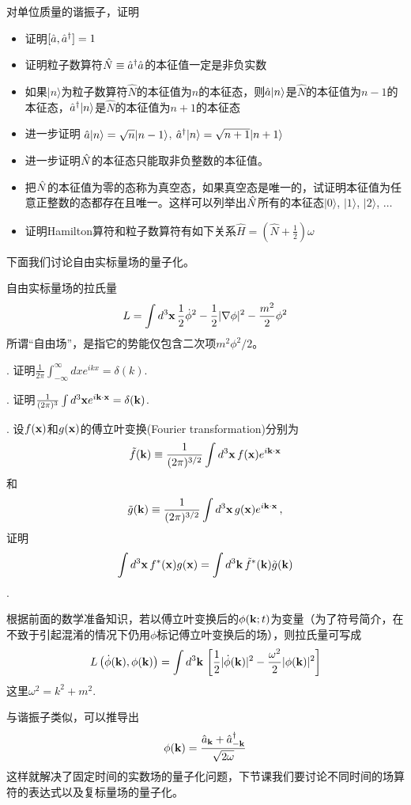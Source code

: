 \documentclass[CJK]{beamer}
\begin{document}
\begin{frame}
\bch
对单位质量的谐振子，证明
\begin{itemize}
\item{证明$[\hat{a}, {\hat{a}^\dagger}] = 1$}
\item{证明粒子数算符$\hat{N} \equiv {\hat{a}^\dagger} \hat{a}$的本征值一定是非负实数}
\item{如果$|n\rangle$为粒子数算符$\hat{N}$的本征值为$n$的本征态，则$\hat{a}|n\rangle$是$\hat{N}$的本征值为$n-1$的本征态，${\hat{a}^\dagger}|n\rangle$是$\hat{N}$的本征值为$n+1$的本征态}
\item{进一步证明 $\hat{a}|n\rangle = \sqrt{n}|n-1\rangle$, ${\hat{a}^\dagger}|n\rangle = \sqrt{n+1}|n+1\rangle$} 
\item{进一步证明$\hat{N}$的本征态只能取非负整数的本征值。}
\item{把$\hat{N}$的本征值为零的态称为真空态，如果真空态是唯一的，试证明本征值为任意正整数的态都存在且唯一。这样可以列举出$\hat{N}$所有的本征态$|0\rangle$, $|1\rangle$, $|2\rangle$, $\ldots$}
\item{证明Hamilton算符和粒子数算符有如下关系$\hat{H} = (\hat{N} + \frac{1}{2})\omega$}
\end{itemize}
\ech
\end{frame}

\begin{frame}
\bch
下面我们讨论自由实标量场的量子化。

\skipline
自由实标量场的拉氏量
$$L = \int d^3\mathbf{x} \, \frac{1}{2}\dot\phi^2 - \frac{1}{2}|\nabla \phi|^2 - \frac{m^2}{2}\phi^2$$
所谓“自由场”，是指它的势能仅包含二次项$m^2\phi^2/2$。

\ech
\end{frame}


\begin{frame}
. 证明$\frac{1}{2\pi}\int_{-\infty}^{\infty} dx e^{ikx} = \delta(k)$.

. 证明$\frac{1}{(2\pi)^3}\int d^3\mathbf{x} e^{i\mathbf{k}\cdot\mathbf{x}} = \delta(\mathbf{k})$.


. 设$f(\mathbf{x})$和$g(\mathbf{x})$的傅立叶变换(Fourier transformation)分别为
$$\tilde{f}(\mathbf{k}) \equiv \frac{1}{(2\pi)^{3/2}}\int d^3\mathbf{x}\, f(\mathbf{x})e^{i\mathbf{k}\cdot\mathbf{x}}$$和
$$\tilde{g}(\mathbf{k}) \equiv \frac{1}{(2\pi)^{3/2}}\int d^3\mathbf{x}\, g(\mathbf{x})e^{i\mathbf{k}\cdot\mathbf{x}}\,,$$
证明
$$\int d^3\mathbf{x}\,f^*(\mathbf{x})g(\mathbf{x}) = \int d^3\mathbf{k}\, \tilde{f}^*(\mathbf{k})\tilde{g}(\mathbf{k})$$.


\ech
\end{frame}

\begin{frame}
\bch
根据前面的数学准备知识，若以傅立叶变换后的$\phi(\mathbf{k};t)$为变量（为了符号简介，在不致于引起混淆的情况下仍用$\phi$标记傅立叶变换后的场），则拉氏量可写成
$$L\left(\dot\phi(\mathbf{k}), \phi(\mathbf{k})\right) = \int d^3\mathbf{k} \,\left[\frac{1}{2}|\dot\phi(\mathbf{k})|^2 - \frac{\omega^2}{2} |\phi(\mathbf{k})|^2\right]$$
这里$\omega^2 = k^2 + m^2$.

\skipline
与谐振子类似，可以推导出
$$\phi(\mathbf{k}) = \frac{\hat{a}_{\mathbf{k}}+{\hat{a}^\dagger}_{-\mathbf{k}}}{\sqrt{2\omega}}$$
这样就解决了固定时间的实数场的量子化问题，下节课我们要讨论不同时间的场算符的表达式以及复标量场的量子化。
\ech
\end{frame}
\end{document}
